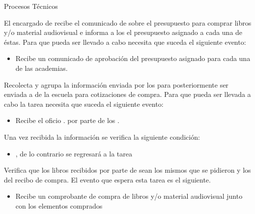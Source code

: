 \begin{PDescripcion}

  \Ppaso Procesos Técnicos

    \begin{enumerate}

      \Ppaso[\itarea]  El encargado de   recibe el comunicado de  sobre el presupuesto para comprar libros y/o material audiovisual e informa a los  el presupuesto asignado a cada una de éstas. Para que pueda ser llevado a cabo necesita que suceda el siguiente evento:


	\begin{itemize}
	  \item Recibe un comunicado de aprobación del presupuesto asignado para cada una de las academias.	
	\end{itemize}

      \Ppaso[\itarea]  Recolecta y agrupa la información enviada por los para posteriormente ser enviada a  de la escuela para cotizaciones de compra. Para que pueda ser llevada a cabo la tarea necesita que suceda el siguiente evento:

	\begin{itemize}
	  \item Recibe el oficio . por parte de los .
	  
	\end{itemize}
	
	Una vez recibida la información se verifica la siguiente condición:
	
	\begin{itemize}
	  \item {}, de lo contrario se regresará a la tarea 
	\end{itemize}
	
	\Ppaso[\itarea] Verifica que los libros recibidos por parte de  sean los mismos que se pidieron y los del recibo de compra. El evento que espera esta tarea es el siguiente.
	\begin{itemize}
	  \item Recibe un comprobante de compra de libros y/o material audiovisual junto con los elementos comprados
	 \end{itemize}
	 

\end{enumerate}
\end{PDescripcion}
